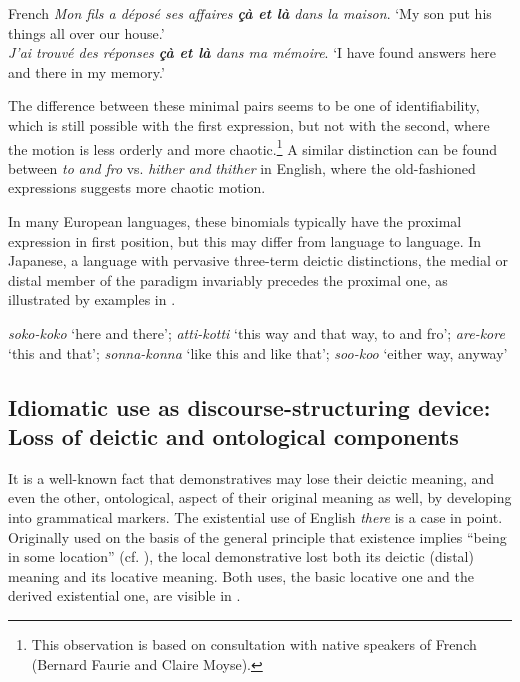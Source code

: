 \documentclass[output=paper,colorlinks,citecolor=brown]{langscibook}
\begin{document}
\ea French \label{ex:koenig:7}
\ea \textit{Mon fils a déposé ses affaires \textbf{çà et là} dans la maison}. \newline ‘My son put his things all over our house.’\\

\ex \textit{J’ai trouvé des réponses \textbf{çà et là} dans ma mémoire}. \newline ‘I have found answers here and there in my memory.’\\
\z
\z


The difference between these minimal pairs seems to be one of identifiability, which is still possible with the first expression, but not with the second, where the motion is less orderly and more chaotic.\footnote{This observation is based on consultation with native speakers of French (Bernard Faurie and Claire Moyse).}  A similar distinction can be found between \textit{to} \textit{and} \textit{fro} vs. \textit{hither} \textit{and} \textit{thither} in English, where the old-fashioned expressions suggests more chaotic motion.

In many European languages, these binomials typically have the proximal expression in first position, but this may differ from language to language. In Japanese, a language with pervasive three-term deictic distinctions, the medial or distal member of the paradigm invariably precedes the proximal one, as illustrated by examples in .

\ea\label{ex:koenig:8}
\textit{soko-koko} ‘here and there’; \textit{atti-kotti} ‘this way and that way, to and fro’; \textit{are-kore} ‘this and that’; \textit{sonna-konna} ‘like this and like that’; \textit{soo-koo} ‘either way, anyway’\\
\z

\subsection{Idiomatic use as discourse-structuring device: Loss of deictic and ontological components}

It is a well-known fact that demonstratives may lose their deictic meaning, and even the other, ontological, aspect of their original meaning as well, by developing into grammatical markers. The existential use of English \textit{there} is a case in point. Originally used on the basis of the general principle that existence implies “being in some location” (cf. \citealt{Lyons1967}), the local demonstrative lost both its deictic (distal) meaning and its locative meaning. Both uses, the basic locative one and the derived existential one, are visible in .
\end{document}
